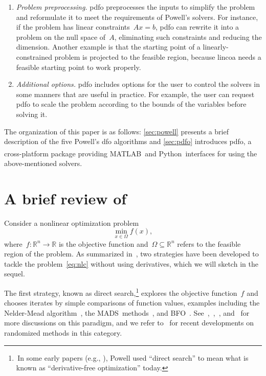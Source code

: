\documentclass[11pt,draft]{article}
\numberwithin{equation}{section}
\def\R{\ensuremath{\mathbb{R}}}
\def\obj{\ensuremath{f}}
\def\srchsp{\ensuremath{\Omega}}
\def\bfo{\mbox{BFO}}
\def\mads{\mbox{MADS}}
\def\matlab{\mbox{MATLAB\textsuperscript{\textregistered}}}
\def\python{\mbox{Python}}
\begin{document}
\begin{enumerate}
    \item \emph{Problem preprocessing.}
    \gls{pdfo} preprocesses the inputs to simplify the problem and reformulate it to meet the requirements of Powell's solvers.
    For instance, if the problem has linear constraints~$A x = b$, \gls{pdfo} can rewrite it into a problem on the null space of~$A$, eliminating such constraints and reducing the dimension.
    Another example is that the starting point of a linearly-constrained problem is projected to the feasible region, because \gls{lincoa} needs a feasible starting point to work properly.

    \item \emph{Additional options.}
    \gls{pdfo} includes options for the user to control the solvers in some manners that are useful in practice.
    For example, the user can request \gls{pdfo} to scale the problem according to the bounds of the variables before solving it.

\end{enumerate}

The organization of this paper is as follows: \cref{sec:powell} presents a brief description of the five Powell's \gls{dfo} algorithms and \cref{sec:pdfo} introduces \gls{pdfo}, a cross-platform package providing \matlab\ and \python\ interfaces for using the above-mentioned solvers.

\section{A brief review of \texorpdfstring{}{DFO methods}}

Consider a nonlinear optimization problem
\begin{equation}
    \label{eq:nlc}
    \min_{x \in \srchsp} \obj(x),
\end{equation}
where~$\obj \colon \R^n \to \R$ is the objective function and~$\srchsp \subseteq \R^n$ refers to the feasible region of the problem.
As summarized in~\cite{Conn_Scheinberg_Vicente_2009b}, two strategies have been developed to tackle the problem~\cref{eq:nlc} without using derivatives, which we will sketch in the sequel.

The first strategy, known as direct search,\footnote{\,In some early papers (e.g., \cite{Powell_1994,Powell_1998}), Powell used \enquote{direct search} to mean what is known as \enquote{derivative-free optimization} today.} explores the objective function~$\obj$ and chooses iterates by simple comparisons of function values, examples including the Nelder-Mead algorithm~\cite{Nelder_Mead_1965}, the \mads\ methods~\cite{Audet_Dennis_2006,Abramson_Audet_2006,Digabel_2011}, and \bfo~\cite{Porcelli_Toint_2017,Porcelli_Toint_2020,Porcelli_Toint_2021}.
See~\cite{Kolda_Lewis_Torczon_2003},~\cite[Chapters~7 and~8]{Conn_Scheinberg_Vicente_2009b},~\cite[Part~3]{Audet_Hare_2017}, and~\cite[Section~2.1]{Larson_Menickelly_Wild_2019} for more discussions on this paradigm, and we refer to~\cite{Gratton_Etal_2015,Gratton_Etal_2019} for recent developments on randomized methods in this category.
\end{document}
